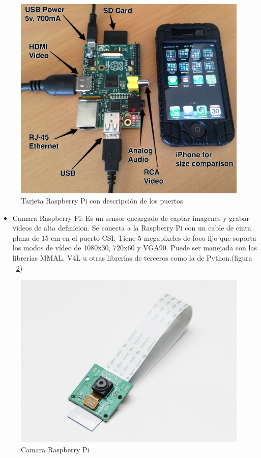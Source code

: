 \begin{figure}[hbtp]
\centering
\label{fig:Raspe}
\includegraphics[scale=0.1]{imagenes/raspberry_pi_iphone.jpg}
\caption{Tarjeta Raspberry Pi con descripción de los puertos}
\end{figure}

\begin{itemize}
\item Camara Raspberry Pi: Es un sensor encargado de captar imagenes y grabar videos de alta definicion. Se conecta a la Raspberry Pi con un cable de cinta plana de 15 cm en el puerto CSI. Tiene 5 megapíxeles de foco fijo que soporta los modos de vídeo de 1080x30, 720x60 y VGA90. Puede ser manejada con las librerías MMAL, V4L u otras librerías de terceros como la de
Python.(figura ~\ref{fig:came}) \cite{raspberrycam} %

\end{itemize}

\begin{figure}[hbtp]
\centering
\label{fig:came}
\includegraphics[scale=0.7]{imagenes/1367-01.jpg}
\caption{Camara Raspberry Pi}
\end{figure}



